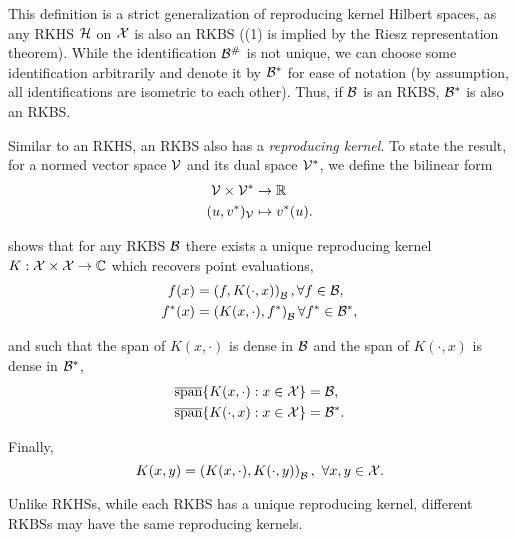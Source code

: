 This definition is a strict generalization of reproducing kernel Hilbert spaces, as any RKHS ${\mathcal{H}}$ on ${\mathcal{X}}$ is also an RKBS ((1) is implied by the Riesz representation theorem). While the identification ${\mathcal{B}}^\#$ is not unique, we can choose some identification arbitrarily and denote it by ${\mathcal{B}}^*$ for ease of notation (by assumption, all identifications are isometric to each other). Thus, if ${\mathcal{B}}$ is an RKBS, ${\mathcal{B}}^*$ is also an RKBS.

Similar to an RKHS, an RKBS also has a \textit{reproducing kernel}. To state the result, for a normed vector space ${\mathcal{V}}$ and its dual space ${\mathcal{V}}^*$, we define the bilinear form
\begin{equation}\label{eq:bilinear_form}
    \begin{split}
        \calV \times \calV^* &\to \reals\\
        (u, v^*)_\calV &\mapsto v^*(u).
    \end{split}
\end{equation}

\parencite[Theorem 2]{zhangReproducingKernel2009} shows that for any RKBS ${\mathcal{B}}$ there exists a unique reproducing kernel $K: {\mathcal{X}} \times {\mathcal{X}} \to {\mathbb{C}}$ which recovers point evaluations,
\begin{align}
    f(x) &= \paren{f, K(\cdot, x)}_\calB, \forall f \in \calB, \\
    f^*(x) &= \paren{K(x, \cdot), f^*}_\calB \forall f^* \in \calB^*,
\end{align}

and such that the span of $K(x, \cdot)$ is dense in ${\mathcal{B}}$ and the span of $K(\cdot, x)$ is dense in ${\mathcal{B}}^*$,
\begin{align}
    \overline{\text{span}}\{K(x, \cdot): x \in \calX\} &= \calB, \\
    \overline{\text{span}}\{K(\cdot, x): x \in \calX\} &= \calB^*.
\end{align}

Finally,
\begin{equation}
    K(x, y) = \paren{K(x, \cdot), K(\cdot, y)}_\calB, \ \forall x, y \in \calX.
\end{equation}

Unlike RKHSs, while each RKBS has a unique reproducing kernel, different RKBSs may have the same reproducing kernels.

